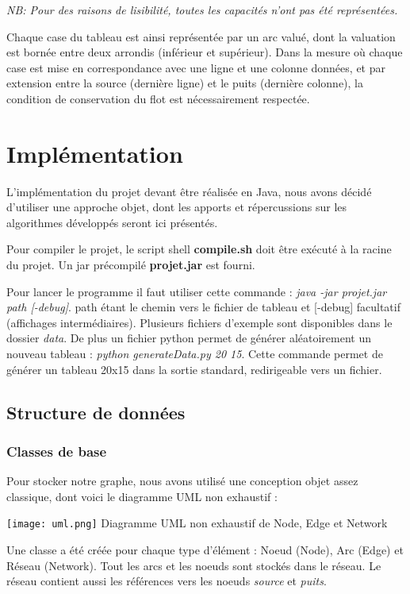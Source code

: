 \documentclass[letterpaper,12pt]{article}
\begin{document}
\textit{NB: Pour des raisons de lisibilité, toutes les capacités n'ont pas été représentées.}
\hfill \break

Chaque case du tableau est ainsi représentée par un arc valué, dont la valuation est bornée entre deux arrondis (inférieur et supérieur). Dans la mesure où chaque case est mise en correspondance avec une ligne et une colonne données, et par extension entre la source (dernière ligne) et le puits (dernière colonne), la condition de conservation du flot est nécessairement respectée.

\section{Implémentation}
L'implémentation du projet devant être réalisée en Java, nous avons décidé d'utiliser une approche objet, dont les apports et répercussions sur les algorithmes développés seront ici présentés.

Pour compiler le projet, le script shell \textbf{compile.sh} doit être exécuté à la racine du projet. Un jar précompilé \textbf{projet.jar} est fourni. 

Pour lancer le programme il faut utiliser cette commande : \textit{java -jar projet.jar path [-debug]}. path étant le chemin vers le fichier de tableau et [-debug] facultatif (affichages intermédiaires). Plusieurs fichiers d'exemple sont disponibles dans le dossier \textit{data}. De plus un fichier python permet de générer aléatoirement un nouveau tableau : \textit{python generateData.py 20 15}. Cette commande permet de générer un tableau 20x15 dans la sortie standard, redirigeable vers un fichier.

\subsection{Structure de données}
\subsubsection{Classes de base}
Pour stocker notre graphe, nous avons utilisé une conception objet assez classique, dont voici le diagramme UML non exhaustif :
\begin{center}
    \texttt{[image: uml.png]}
    Diagramme UML non exhaustif de Node, Edge et Network
\end{center}
\hfill \break
Une classe a été créée pour chaque type d'élément : Noeud (Node), Arc (Edge) et Réseau (Network). Tout les arcs et les noeuds sont stockés dans le réseau. Le réseau contient aussi les références vers les noeuds \textit{source} et \textit{puits}.
\end{document}
